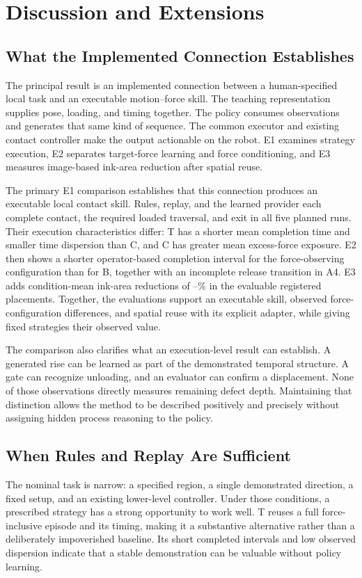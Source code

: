 \chapter{Discussion and Extensions}
\label{chap:discussion}

\section{What the Implemented Connection Establishes}
The principal result is an implemented connection between a human-specified local task and an executable motion--force skill. The teaching representation supplies pose, loading, and timing together. The policy consumes observations and generates that same kind of sequence. The common executor and existing contact controller make the output actionable on the robot. E1 examines strategy execution, E2 separates target-force learning and force conditioning, and E3 measures image-based ink-area reduction after spatial reuse.

The primary E1 comparison establishes that this connection produces an executable local contact skill. Rules, replay, and the learned provider each complete contact, the required loaded traversal, and exit in all five planned runs. Their execution characteristics differ: T has a shorter mean completion time and smaller time dispersion than C, and C has greater mean excess-force exposure. E2 then shows a shorter operator-based completion interval for the force-observing configuration than for B, together with an incomplete release transition in A4. E3 adds condition-mean ink-area reductions of \EthreeDtwoRemoval--\EthreeNRemoval\% in the evaluable registered placements. Together, the evaluations support an executable skill, observed force-configuration differences, and spatial reuse with its explicit adapter, while giving fixed strategies their observed value.

The comparison also clarifies what an execution-level result can establish. A generated rise can be learned as part of the demonstrated temporal structure. A gate can recognize unloading, and an evaluator can confirm a displacement. None of those observations directly measures remaining defect depth. Maintaining that distinction allows the method to be described positively and precisely without assigning hidden process reasoning to the policy.

\section{When Rules and Replay Are Sufficient}
The nominal task is narrow: a specified region, a single demonstrated direction, a fixed setup, and an existing lower-level controller. Under those conditions, a prescribed strategy has a strong opportunity to work well. T reuses a full force-inclusive episode and its timing, making it a substantive alternative rather than a deliberately impoverished baseline. Its short completed intervals and low observed dispersion indicate that a stable demonstration can be valuable without policy learning.

